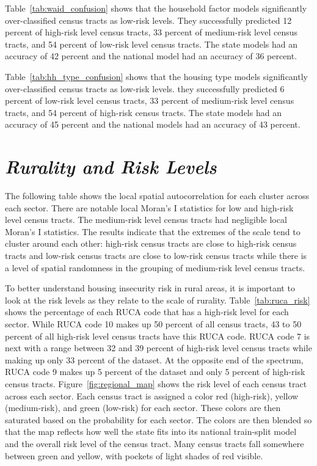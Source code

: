  

Table~\ref{tab:waid_confusion} shows that the household factor models significantly over-classified census tracts as low-risk levels. They successfully predicted 12 percent of high-risk level census tracts, 33 percent of medium-risk level census tracts, and 54 percent of low-risk level census tracts. The state models had an accuracy of 42 percent and the national model had an accuracy of 36 percent. 



Table~\ref{tab:hh_type_confusion} shows that the housing type models significantly over-classified census tracts as low-risk levels. they successfully predicted 6 percent of low-risk level census tracts, 33 percent of medium-risk level census tracts, and 54 percent of high-risk census tracts. The state models had an accuracy of 45 percent and the national models had an accuracy of 43 percent. 



\section{\textit{Rurality and Risk Levels}}

The following table shows the local spatial autocorrelation for each cluster across each sector. There are notable local Moran's I statistics for low and high-risk level census tracts. The medium-risk level census tracts had negligible local Moran's I statistics. The results indicate that the extremes of the scale tend to cluster around each other: high-risk census tracts are close to high-risk census tracts and low-risk census tracts are close to low-risk census tracts while there is a level of spatial randomness in the grouping of medium-risk level census tracts. 



To better understand housing insecurity risk in rural areas, it is important to look at the risk levels as they relate to the scale of rurality. Table~\ref{tab:ruca_risk} shows the percentage of each RUCA code that has a high-risk level for each sector. While RUCA code 10 makes up 50 percent of all census tracts, 43 to 50 percent of all high-risk level census tracts have this RUCA code. RUCA code 7 is next with a range between 32 and 39 percent of high-risk level census tracts while making up only 33 percent of the dataset. At the opposite end of the spectrum, RUCA code 9 makes up 5 percent of the dataset and only 5 percent of high-risk census tracts. Figure~\ref{fig:regional_map} shows the risk level of each census tract across each sector. Each census tract is assigned a color red (high-risk), yellow (medium-risk), and green (low-risk) for each sector. These colors are then saturated based on the probability for each sector. The colors are then blended so that the map reflects how well the state fits into its national train-split model and the overall risk level of the census tract. Many census tracts fall somewhere between green and yellow, with pockets of light shades of red visible. 

